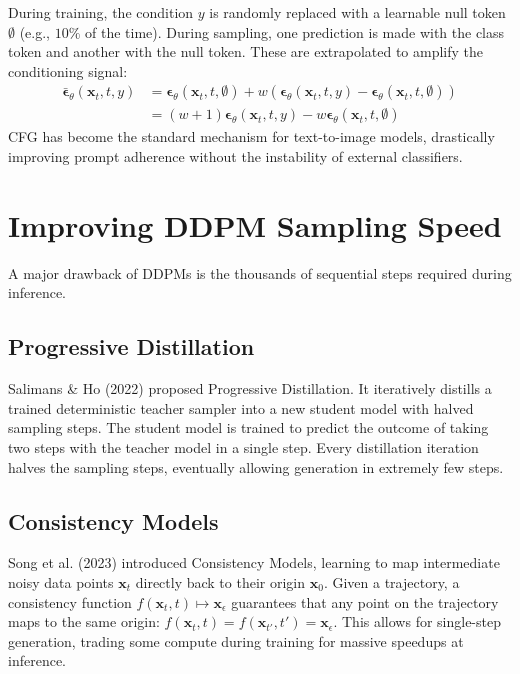 During training, the condition $y$ is randomly replaced with a learnable null token $\emptyset$ (e.g., $10\%$ of the time). During sampling, one prediction is made with the class token and another with the null token. These are extrapolated to amplify the conditioning signal:
\begin{align}
    \bar{\boldsymbol{\epsilon}}_\theta(\mathbf{x}_t, t, y) &= \boldsymbol{\epsilon}_\theta(\mathbf{x}_t, t, \emptyset) + w \left( \boldsymbol{\epsilon}_\theta(\mathbf{x}_t, t, y) - \boldsymbol{\epsilon}_\theta(\mathbf{x}_t, t, \emptyset) \right) \\
    &= (w+1)\boldsymbol{\epsilon}_\theta(\mathbf{x}_t, t, y) - w \boldsymbol{\epsilon}_\theta(\mathbf{x}_t, t, \emptyset)
\end{align}
CFG has become the standard mechanism for text-to-image models, drastically improving prompt adherence without the instability of external classifiers.

\section{Improving DDPM Sampling Speed}

A major drawback of DDPMs is the thousands of sequential steps required during inference.

\subsection{Progressive Distillation}
Salimans \& Ho (2022) proposed Progressive Distillation. It iteratively distills a trained deterministic teacher sampler into a new student model with halved sampling steps. The student model is trained to predict the outcome of taking two steps with the teacher model in a single step. Every distillation iteration halves the sampling steps, eventually allowing generation in extremely few steps.

\subsection{Consistency Models}
Song et al. (2023) introduced Consistency Models, learning to map intermediate noisy data points $\mathbf{x}_t$ directly back to their origin $\mathbf{x}_0$. Given a trajectory, a consistency function $f(\mathbf{x}_t, t) \mapsto \mathbf{x}_\epsilon$ guarantees that any point on the trajectory maps to the same origin: $f(\mathbf{x}_t, t) = f(\mathbf{x}_{t'}, t') = \mathbf{x}_\epsilon$. This allows for single-step generation, trading some compute during training for massive speedups at inference.

